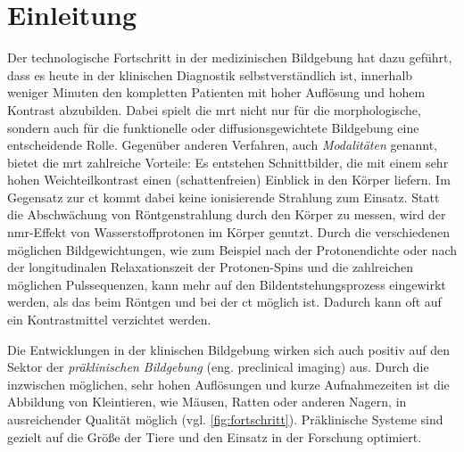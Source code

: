 \chapter{Einleitung}
Der technologische Fortschritt in der medizinischen Bildgebung hat dazu geführt, dass es heute in der klinischen Diagnostik selbstverständlich ist, innerhalb weniger Minuten den kompletten Patienten mit hoher Auflösung und hohem Kontrast abzubilden.
Dabei spielt die \gls{mrt} nicht nur für die morphologische, sondern auch für die funktionelle oder diffusionsgewichtete Bildgebung eine entscheidende Rolle. Gegenüber anderen Verfahren, auch \textit{Modalitäten} genannt, bietet die \gls{mrt} zahlreiche Vorteile: Es entstehen Schnittbilder, die mit einem sehr hohen Weichteilkontrast einen (schattenfreien) Einblick in den Körper liefern. Im Gegensatz zur \gls{ct} kommt dabei keine ionisierende Strahlung zum Einsatz. Statt die Abschwächung von Röntgenstrahlung durch den Körper zu messen, wird der \gls{nmr}-Effekt von Wasserstoffprotonen im Körper genutzt. Durch die verschiedenen möglichen Bildgewichtungen, wie zum Beispiel nach der Protonendichte oder nach der longitudinalen Relaxationszeit der Protonen-Spins und die zahlreichen möglichen Pulssequenzen, kann mehr auf den Bildentstehungsprozess eingewirkt werden, als das beim Röntgen und bei der \gls{ct} möglich ist. Dadurch kann oft auf ein Kontrastmittel verzichtet werden.

Die Entwicklungen in der klinischen Bildgebung wirken sich auch positiv auf den Sektor der \textit{präklinischen Bildgebung} (eng. preclinical imaging) aus. Durch die inzwischen möglichen, sehr hohen Auflösungen und kurze Aufnahmezeiten ist die Abbildung von Kleintieren, wie Mäusen, Ratten oder anderen Nagern, in ausreichender Qualität möglich (vgl. \autoref{fig:fortschritt}). Präklinische Systeme sind gezielt auf die Größe der Tiere und den Einsatz in der Forschung optimiert.

